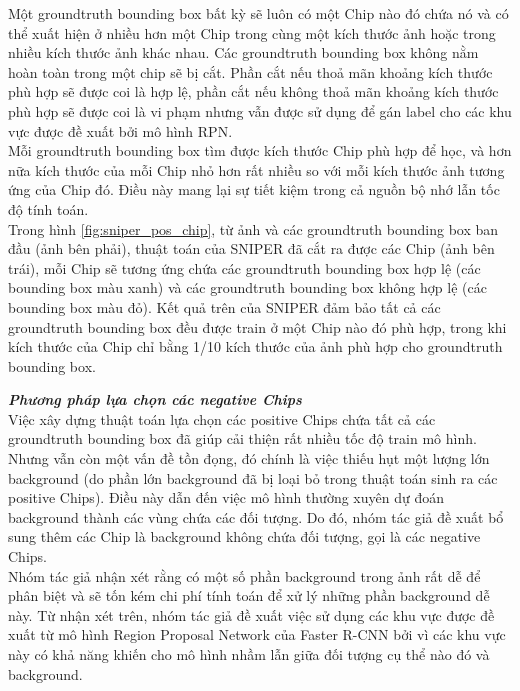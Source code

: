 {    \noindent
    Một groundtruth bounding box bất kỳ sẽ luôn có một Chip nào đó chứa nó và có thể xuất hiện ở nhiều hơn một Chip trong cùng một kích thước ảnh hoặc trong nhiều kích thước ảnh khác nhau.
    Các groundtruth bounding box không nằm hoàn toàn trong một chip sẽ bị cắt.
    Phần cắt nếu thoả mãn khoảng kích thước phù hợp sẽ được coi là hợp lệ, phần cắt nếu không thoả mãn khoảng kích thước phù hợp sẽ được coi là vi phạm nhưng vẫn được sử dụng để gán label cho các khu vực được đề xuất bởi mô hình RPN. \\
    Mỗi groundtruth bounding box tìm được kích thước Chip phù hợp để học, và hơn nữa kích thước của mỗi Chip nhỏ hơn rất nhiều so với mỗi kích thước ảnh tương ứng của Chip đó.
    Điều này mang lại sự tiết kiệm trong cả nguồn bộ nhớ lẫn tốc độ tính toán. \\
    Trong hình \ref{fig:sniper_pos_chip}, từ ảnh và các groundtruth bounding box ban đầu (ảnh bên phải), thuật toán của SNIPER đã cắt ra được các Chip (ảnh bên trái), mỗi Chip sẽ tương ứng chứa các groundtruth bounding box hợp lệ (các bounding box màu xanh) và các groundtruth bounding box không hợp lệ (các bounding box màu đỏ).
    Kết quả trên của SNIPER đảm bảo tất cả các groundtruth bounding box đều được train ở một Chip nào đó phù hợp, trong khi kích thước của Chip chỉ bằng 1/10 kích thước của ảnh phù hợp cho groundtruth bounding box.

    \noindent
    \textbf{\textit{Phương pháp lựa chọn các negative Chips}} \\
    Việc xây dựng thuật toán lựa chọn các positive Chips chứa tất cả các groundtruth bounding box đã giúp cải thiện rất nhiều tốc độ train mô hình.
    Nhưng vẫn còn một vấn đề tồn đọng, đó chính là việc thiếu hụt một lượng lớn background (do phần lớn background đã bị loại bỏ trong thuật toán sinh ra các positive Chips).
    Điều này dẫn đến việc mô hình thường xuyên dự đoán background thành các vùng chứa các đối tượng.
    Do đó, nhóm tác giả đề xuất bổ sung thêm các Chip là background không chứa đối tượng, gọi là các negative Chips. \\
    Nhóm tác giả nhận xét rằng có một số phần background trong ảnh rất dễ để phân biệt và sẽ tốn kém chi phí tính toán để xử lý những phần background dễ này.
    Từ nhận xét trên, nhóm tác giả đề xuất việc sử dụng các khu vực được đề xuất từ mô hình Region Proposal Network của Faster R-CNN bởi vì các khu vực này có khả năng khiến cho mô hình nhầm lẫn giữa đối tượng cụ thể nào đó và background.

}
